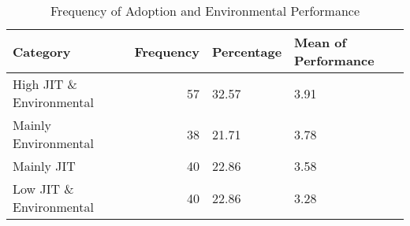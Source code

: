 \begin{table}[htbp]
    \centering
    \caption{Frequency of Adoption and Environmental Performance}
    \label{tab:your_label}
    \begin{tabular}{lrll}
\toprule
Category & Frequency & Percentage & Mean of Performance \\
\midrule
High JIT \& Environmental & 57 & 32.57 & 3.91 \\
Mainly Environmental & 38 & 21.71 & 3.78 \\
Mainly JIT & 40 & 22.86 & 3.58 \\
Low JIT \& Environmental & 40 & 22.86 & 3.28 \\
\bottomrule
\end{tabular}

    \end{table}
    